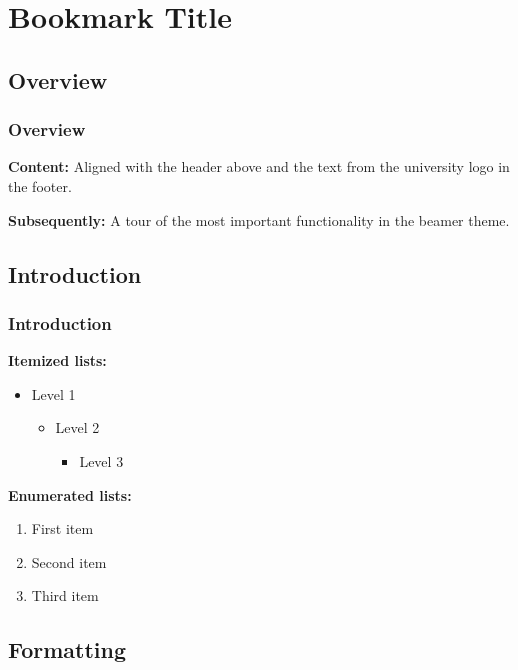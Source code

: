 \documentclass[11pt,t,usepdftitle=false,aspectratio=169]{beamer}
\begin{document}
\section{Bookmark Title}

\subsection{Overview}

\begin{frame}
\frametitle{Overview}

  \textbf{Content:} Aligned with the header above and the text from the university logo in the footer.

  \bigskip

  \textbf{Subsequently:} A tour of the most important functionality in the beamer theme.

\end{frame}


\subsection{Introduction}


\begin{frame}
\frametitle{Introduction}

   
   \textbf{Itemized lists:}
   \begin{itemize}
      \item Level 1
      \begin{itemize}
         \item Level 2
         \begin{itemize}
            \item Level 3
         \end{itemize}
      \end{itemize}
   \end{itemize}

\bigskip

   \textbf{Enumerated lists:}
   \begin{enumerate}
      \item First item
      \item Second item
      \item Third item
   \end{enumerate}

\end{frame}


\subsection{Formatting}
\end{document}
